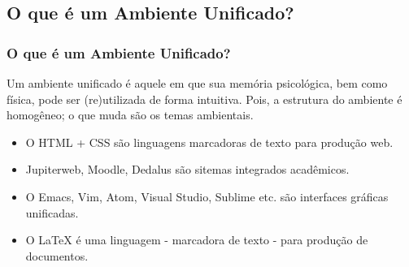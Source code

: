\documentclass{beamer}
\begin{document}
\begin{frame}

  \section{O que é um Ambiente Unificado?}
  \frametitle{
    {\textcolor{yellow!70!black}{ {\LARGE {}}} %
      \textcolor{red!70!black}{O que é um Ambiente Unificado?}}} %
  \pause
  \begin{tcolorbox}[colback=blue!5!white, colframe=violet!65!white,
    title={\sc{\bf{Definição}}}]
    Um \alert{ambiente unificado} é aquele em que sua memória psicológica, bem como
    física, pode ser (re)utilizada de forma intuitiva. Pois, a estrutura do ambiente é
    homogêneo; o que muda são os temas ambientais.
  \end{tcolorbox}
  \pause

  \begin{tcolorbox}[colback=red!5!white,colframe=red!70!white,title=Exemplos]
    \begin{itemize}

    \item[{\textcolor{red!10!white}{\ding{166}}}] O HTML + CSS são linguagens marcadoras de texto para produção web.
      \pause

    \item[{\textcolor{red!30!white}{\ding{166}}}] Jupiterweb, Moodle, Dedalus são sitemas integrados acadêmicos.
      \pause
    \item[{\textcolor{red!50!white}{\ding{166}}}] O Emacs, Vim, Atom, Visual Studio, Sublime etc. são interfaces gráficas unificadas.
      \pause
    \item[{\textcolor{red!70!white}{\ding{166}}}] O \alert{\LaTeX} é uma linguagem - marcadora de texto - para produção de documentos.
    \end{itemize}
  \end{tcolorbox}




\end{frame}
\end{document}
